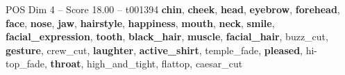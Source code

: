 \begin{textsample}{POS Dim 4 – Score 18.00 – t001394}  \label{ex:f4_pos_029}
\textbf{chin}, \textbf{cheek}, \textbf{head}, \textbf{eyebrow}, \textbf{forehead}, \textbf{face}, \textbf{nose}, \textbf{jaw}, \textbf{hairstyle}, \textbf{happiness}, \textbf{mouth}, \textbf{neck}, \textbf{smile}, \textbf{facial\_expression}, \textbf{tooth}, \textbf{black\_hair}, \textbf{muscle}, \textbf{facial\_hair}, buzz\_cut, \textbf{gesture}, crew\_cut, \textbf{laughter}, \textbf{active\_shirt}, temple\_fade, \textbf{pleased}, hi-top\_fade, \textbf{throat}, high\_and\_tight, flattop, caesar\_cut

\end{textsample}
